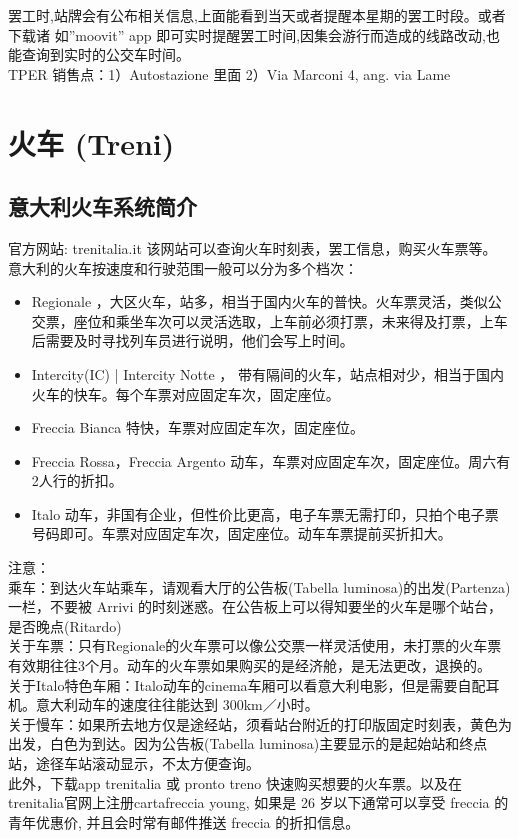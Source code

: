 罢工时,站牌会有公布相关信息,上面能看到当天或者提醒本星期的罢工时段。或者下载诸 如”moovit” app 即可实时提醒罢工时间,因集会游行而造成的线路改动,也能查询到实时的公交车时间。\\
TPER 销售点：1）Autostazione 里面 2）Via Marconi 4, ang. via Lame



\section{火车 (Treni)}

\subsection{意大利火车系统简介}

官方网站: trenitalia.it 该网站可以查询火车时刻表，罢工信息，购买火车票等。
意大利的火车按速度和行驶范围一般可以分为多个档次：
\begin{itemize}
\item  Regionale ，大区火车，站多，相当于国内火车的普快。火车票灵活，类似公交票，座位和乘坐车次可以灵活选取，上车前必须打票，未来得及打票，上车后需要及时寻找列车员进行说明，他们会写上时间。
\item  Intercity(IC) | Intercity Notte ， 带有隔间的火车，站点相对少，相当于国内火车的快车。每个车票对应固定车次，固定座位。
\item  Freccia Bianca 特快，车票对应固定车次，固定座位。
\item  Freccia Rossa，Freccia Argento 动车，车票对应固定车次，固定座位。周六有2人行的折扣。
\item  Italo 动车，非国有企业，但性价比更高，电子车票无需打印，只拍个电子票号码即可。车票对应固定车次，固定座位。动车车票提前买折扣大。
\end{itemize}
注意：\\
乘车：到达火车站乘车，请观看大厅的公告板(Tabella luminosa)的出发(Partenza)一栏，不要被 Arrivi 的时刻迷惑。在公告板上可以得知要坐的火车是哪个站台，是否晚点(Ritardo) \\
关于车票：只有Regionale的火车票可以像公交票一样灵活使用，未打票的火车票有效期往往3个月。动车的火车票如果购买的是经济舱，是无法更改，退换的。\\
关于Italo特色车厢：Italo动车的cinema车厢可以看意大利电影，但是需要自配耳机。意大利动车的速度往往能达到 300km／小时。\\
关于慢车：如果所去地方仅是途经站，须看站台附近的打印版固定时刻表，黄色为出发，白色为到达。因为公告板(Tabella luminosa)主要显示的是起始站和终点站，途径车站滚动显示，不太方便查询。\\
此外，下载app trenitalia 或 pronto treno 快速购买想要的火车票。以及在trenitalia官网上注册cartafreccia
young, 如果是 26 岁以下通常可以享受 freccia 的青年优惠价, 并且会时常有邮件推送 freccia 的折扣信息。

